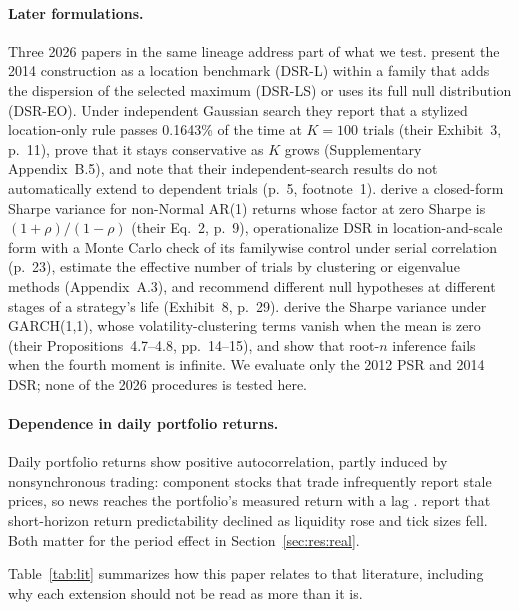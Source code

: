 \documentclass[11pt,a4paper]{article}
\begin{document}
\paragraph{Later formulations.} Three 2026 papers in the same lineage address part of what we test. \citet{lopezdeprado2026porcu} present the 2014 construction as a location benchmark (DSR-L) within a family that adds the dispersion of the selected maximum (DSR-LS) or uses its full null distribution (DSR-EO). Under independent Gaussian search they report that a stylized location-only rule passes 0.1643\% of the time at $K=100$ trials (their Exhibit~3, p.~11), prove that it stays conservative as $K$ grows (Supplementary Appendix~B.5), and note that their independent-search results do not automatically extend to dependent trials (p.~5, footnote~1). \citet{lopezdeprado2026lipton} derive a closed-form Sharpe variance for non-Normal AR(1) returns whose factor at zero Sharpe is $(1+\rho)/(1-\rho)$ (their Eq.~2, p.~9), operationalize DSR in location-and-scale form with a Monte Carlo check of its familywise control under serial correlation (p.~23), estimate the effective number of trials by clustering or eigenvalue methods (Appendix~A.3), and recommend different null hypotheses at different stages of a strategy's life (Exhibit~8, p.~29). \citet{lopezdeprado2026garch} derive the Sharpe variance under GARCH(1,1), whose volatility-clustering terms vanish when the mean is zero (their Propositions~4.7--4.8, pp.~14--15), and show that root-$n$ inference fails when the fourth moment is infinite. We evaluate only the 2012 PSR and 2014 DSR; none of the 2026 procedures is tested here.

\paragraph{Dependence in daily portfolio returns.} Daily portfolio returns show positive autocorrelation, partly induced by nonsynchronous trading: component stocks that trade infrequently report stale prices, so news reaches the portfolio's measured return with a lag \citep{lo1988,lo1990}. \citet{chordia2005,chordia2008} report that short-horizon return predictability declined as liquidity rose and tick sizes fell. Both matter for the period effect in Section~\ref{sec:res:real}.

Table~\ref{tab:lit} summarizes how this paper relates to that literature, including why each extension should not be read as more than it is.
\end{document}
